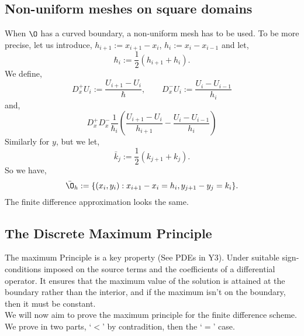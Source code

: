 
\subsection{Non-uniform meshes on square domains}
When $\O$ has a curved boundary, a non-uniform mesh has to be used. To be more precise, let us introduce, $h_{i+1} := x_{i+1}-x_i$, $h_{i} := x_{i} - x_{i-1}$ and let,
$$ \hbar_i := \frac{1}{2}(h_{i+1} + h_i). $$
We define,
$$ D_x^+ U_i := \frac{U_{i+1} - U_i}{\hbar}, \qquad D_x^- U_i := \frac{U_i - U_{i-1}}{h_i} $$
and,
$$ D_x^+D_x^- \frac{1}{\hbar_i} \left( \frac{U_{i+1} - U_i}{h_{i+1}} - \frac{U_i - U_{i-1}}{h_i} \right) $$
Similarly for $y$, but we let,
$$ \bar k_j := \frac{1}{2}(k_{j+1} + k_j). $$
So we have,
$$ \bar\O_h := \{(x_i, y_i) : x_{i+1} - x_i = h_i, y_{j+1} - y_j = k_i\}. $$
The finite difference approximation looks the same.

\subsection{The Discrete Maximum Principle}
The maximum Principle is a key property (See PDEs in Y3). Under suitable sign-conditions imposed on the source terms and the coefficients of a differential operator. It ensures that the maximum value of the solution is attained at the boundary rather than the interior, and if the maximum isn't on the boundary, then it must be constant.\\

\noindent
We will now aim to prove the maximum principle for the finite difference scheme. We prove in two parts, `$<$' by contradition, then the `$=$' case.\\

